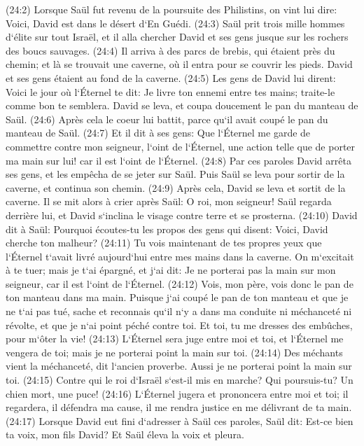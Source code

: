 \verse (24:2) Lorsque Saül fut revenu de la poursuite des Philistins, on vint lui dire: Voici, David est dans le désert d`En Guédi. 
\verse (24:3) Saül prit trois mille hommes d`élite sur tout Israël, et il alla chercher David et ses gens jusque sur les rochers des boucs sauvages. 
\verse (24:4) Il arriva à des parcs de brebis, qui étaient près du chemin; et là se trouvait une caverne, où il entra pour se couvrir les pieds. David et ses gens étaient au fond de la caverne. 
\verse (24:5) Les gens de David lui dirent: Voici le jour où l`Éternel te dit: Je livre ton ennemi entre tes mains; traite-le comme bon te semblera. David se leva, et coupa doucement le pan du manteau de Saül. 
\verse (24:6) Après cela le coeur lui battit, parce qu`il avait coupé le pan du manteau de Saül. 
\verse (24:7) Et il dit à ses gens: Que l`Éternel me garde de commettre contre mon seigneur, l`oint de l`Éternel, une action telle que de porter ma main sur lui! car il est l`oint de l`Éternel. 
\verse (24:8) Par ces paroles David arrêta ses gens, et les empêcha de se jeter sur Saül. Puis Saül se leva pour sortir de la caverne, et continua son chemin. 
\verse (24:9) Après cela, David se leva et sortit de la caverne. Il se mit alors à crier après Saül: O roi, mon seigneur! Saül regarda derrière lui, et David s`inclina le visage contre terre et se prosterna. 
\verse (24:10) David dit à Saül: Pourquoi écoutes-tu les propos des gens qui disent: Voici, David cherche ton malheur? 
\verse (24:11) Tu vois maintenant de tes propres yeux que l`Éternel t`avait livré aujourd`hui entre mes mains dans la caverne. On m`excitait à te tuer; mais je t`ai épargné, et j`ai dit: Je ne porterai pas la main sur mon seigneur, car il est l`oint de l`Éternel. 
\verse (24:12) Vois, mon père, vois donc le pan de ton manteau dans ma main. Puisque j`ai coupé le pan de ton manteau et que je ne t`ai pas tué, sache et reconnais qu`il n`y a dans ma conduite ni méchanceté ni révolte, et que je n`ai point péché contre toi. Et toi, tu me dresses des embûches, pour m`ôter la vie! 
\verse (24:13) L`Éternel sera juge entre moi et toi, et l`Éternel me vengera de toi; mais je ne porterai point la main sur toi. 
\verse (24:14) Des méchants vient la méchanceté, dit l`ancien proverbe. Aussi je ne porterai point la main sur toi. 
\verse (24:15) Contre qui le roi d`Israël s`est-il mis en marche? Qui poursuis-tu? Un chien mort, une puce! 
\verse (24:16) L`Éternel jugera et prononcera entre moi et toi; il regardera, il défendra ma cause, il me rendra justice en me délivrant de ta main. 
\verse (24:17) Lorsque David eut fini d`adresser à Saül ces paroles, Saül dit: Est-ce bien ta voix, mon fils David? Et Saül éleva la voix et pleura. 
